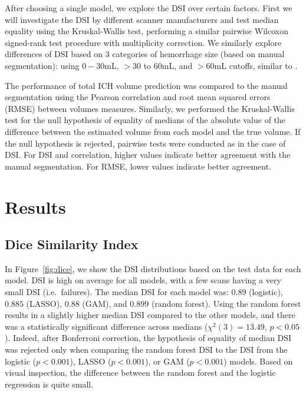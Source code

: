 \documentclass{elsarticle_nonatbib}\usepackage[]{graphicx}\usepackage[]{color}
\begin{document}
After choosing a single model, we explore the DSI over certain factors.  First we will investigate the DSI by different scanner manufacturers and test median equality using the Kruskal-Wallis test, performing a similar pairwise Wilcoxon signed-rank test procedure with multiplicity correction.  We similarly explore differences of DSI based on 3 categories of hemorrhage size (based on manual segmentation): using $0-30$mL, $> 30$ to $60$mL, and $>60$mL cutoffs, similar to \citet{hemphill_ich_2001}. 


The performance of total ICH volume prediction was compared to the manual segmentation using the Pearson correlation and root mean squared errors (RMSE) between volumes measures.  Similarly, we performed the Kruskal-Wallis test for the null hypothesis of equality of medians of the absolute value of the difference between the estimated volume from each model and the true volume.  If the null hypothesis is rejected, pairwise tests were conducted as in the case of DSI.  For DSI and correlation, higher values indicate better agreement with the manual segmentation.  For RMSE, lower values indicate better agreement.


\section{Results}

\subsection{Dice Similarity Index}
In Figure~\ref{fig:dice}, we show the DSI distributions based on the test data for each model.  DSI is high on average for all models, with a few scans having a very small DSI (i.e.~failures).   The median DSI for each model was: $0.89$ (logistic), $0.885$  (LASSO), $0.88$ (GAM), and $0.899$ (random forest).
Using the random forest results in a slightly higher median DSI compared to the other models, and there was a statistically significant difference across medians ($\chi^{2}(3)=13.49$, $p < 0.05$).  Indeed, after Bonferroni correction, the hypothesis of equality of median DSI was rejected only when comparing the random forest DSI to the DSI from the logistic ($p < 0.001$), LASSO ($p < 0.001$), or GAM ($p < 0.001$) models.  Based on visual inspection, the difference between the random forest and the logistic regression is quite small.
\end{document}
